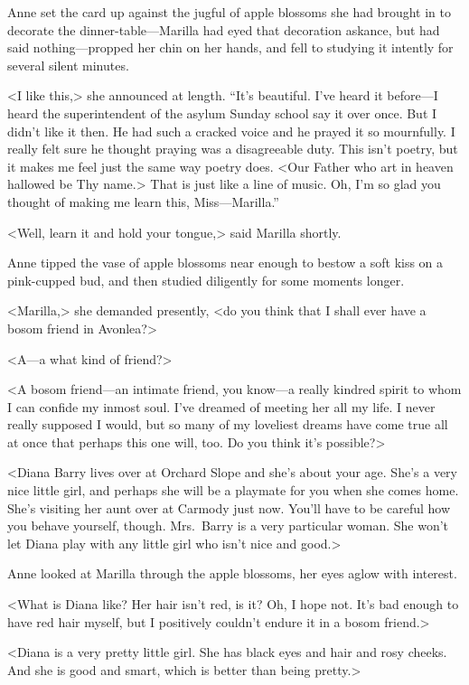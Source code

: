 Anne set the card up against the jugful of apple blossoms she had brought in to decorate the dinner-table—Marilla had eyed that decoration askance, but had said nothing—propped her chin on her hands, and fell to studying it intently for several silent minutes.

<I like this,> she announced at length. “It's beautiful. I've heard it before—I heard the superintendent of the asylum Sunday school say it over once. But I didn't like it then. He had such a cracked voice and he prayed it so mournfully. I really felt sure he thought praying was a disagreeable duty. This isn't poetry, but it makes me feel just the same way poetry does. <Our Father who art in heaven hallowed be Thy name.> That is just like a line of music. Oh, I'm so glad you thought of making me learn this, Miss—Marilla.”

<Well, learn it and hold your tongue,> said Marilla shortly.

Anne tipped the vase of apple blossoms near enough to bestow a soft kiss on a pink-cupped bud, and then studied diligently for some moments longer.

<Marilla,> she demanded presently, <do you think that I shall ever have a bosom friend in Avonlea?>

<A—a what kind of friend?>

<A bosom friend—an intimate friend, you know—a really kindred spirit to whom I can confide my inmost soul. I've dreamed of meeting her all my life. I never really supposed I would, but so many of my loveliest dreams have come true all at once that perhaps this one will, too. Do you think it's possible?>

<Diana Barry lives over at Orchard Slope and she's about your age. She's a very nice little girl, and perhaps she will be a playmate for you when she comes home. She's visiting her aunt over at Carmody just now. You'll have to be careful how you behave yourself, though. Mrs.~Barry is a very particular woman. She won't let Diana play with any little girl who isn't nice and good.>

Anne looked at Marilla through the apple blossoms, her eyes aglow with interest.

<What is Diana like? Her hair isn't red, is it? Oh, I hope not. It's bad enough to have red hair myself, but I positively couldn't endure it in a bosom friend.>

<Diana is a very pretty little girl. She has black eyes and hair and rosy cheeks. And she is good and smart, which is better than being pretty.>

